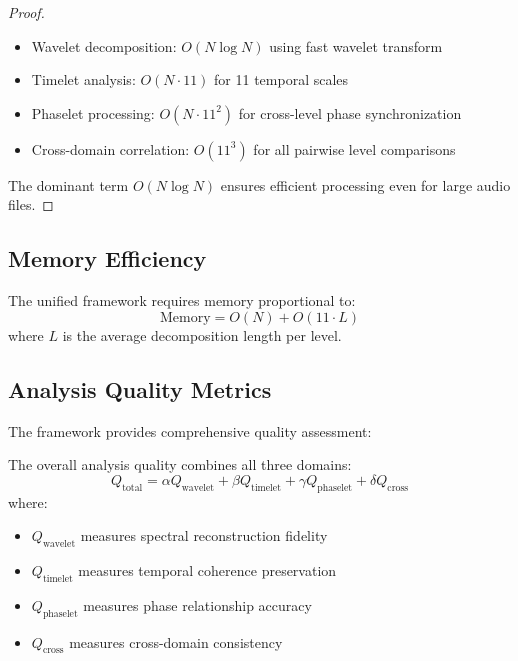 \begin{proof}
\begin{itemize}
    \item Wavelet decomposition: $O(N \log N)$ using fast wavelet transform
    \item Timelet analysis: $O(N \cdot 11)$ for 11 temporal scales
    \item Phaselet processing: $O(N \cdot 11^2)$ for cross-level phase synchronization
    \item Cross-domain correlation: $O(11^3)$ for all pairwise level comparisons
\end{itemize}
The dominant term $O(N \log N)$ ensures efficient processing even for large audio files.
\end{proof}

\subsection{Memory Efficiency}

\begin{theorem}
The unified framework requires memory proportional to:
\begin{equation}
\text{Memory} = O(N) + O(11 \cdot L)
\end{equation}
where $L$ is the average decomposition length per level.
\end{theorem}

\subsection{Analysis Quality Metrics}

The framework provides comprehensive quality assessment:

\begin{definition}
The overall analysis quality combines all three domains:
\begin{equation}
Q_{\text{total}} = \alpha Q_{\text{wavelet}} + \beta Q_{\text{timelet}} + \gamma Q_{\text{phaselet}} + \delta Q_{\text{cross}}
\end{equation}
where:
\begin{itemize}
    \item $Q_{\text{wavelet}}$ measures spectral reconstruction fidelity
    \item $Q_{\text{timelet}}$ measures temporal coherence preservation
    \item $Q_{\text{phaselet}}$ measures phase relationship accuracy
    \item $Q_{\text{cross}}$ measures cross-domain consistency
\end{itemize}
\end{definition}

